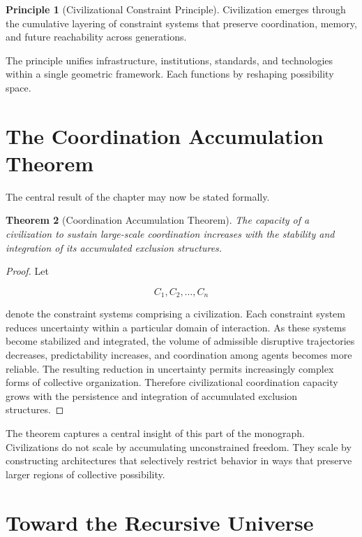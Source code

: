 \documentclass[11pt,oneside]{book}
\theoremstyle{plain}
\newtheorem{theorem}{Theorem}[chapter]
\theoremstyle{definition}
\newtheorem{principle}[theorem]{Principle}
\theoremstyle{remark}
\begin{document}
\begin{principle}[Civilizational Constraint Principle]
Civilization emerges through the cumulative layering of constraint systems that preserve coordination, memory, and future reachability across generations.
\end{principle}

The principle unifies infrastructure, institutions, standards, and technologies within a single geometric framework. Each functions by reshaping possibility space.

\section{The Coordination Accumulation Theorem}

The central result of the chapter may now be stated formally.

\begin{theorem}[Coordination Accumulation Theorem]
The capacity of a civilization to sustain large-scale coordination increases with the stability and integration of its accumulated exclusion structures.
\end{theorem}

\begin{proof}
Let

\begin{equation}
C_1,C_2,\ldots,C_n
\end{equation}

denote the constraint systems comprising a civilization. Each constraint system reduces uncertainty within a particular domain of interaction. As these systems become stabilized and integrated, the volume of admissible disruptive trajectories decreases, predictability increases, and coordination among agents becomes more reliable. The resulting reduction in uncertainty permits increasingly complex forms of collective organization. Therefore civilizational coordination capacity grows with the persistence and integration of accumulated exclusion structures.
\end{proof}

The theorem captures a central insight of this part of the monograph. Civilizations do not scale by accumulating unconstrained freedom. They scale by constructing architectures that selectively restrict behavior in ways that preserve larger regions of collective possibility.

\section{Toward the Recursive Universe}
\end{document}
